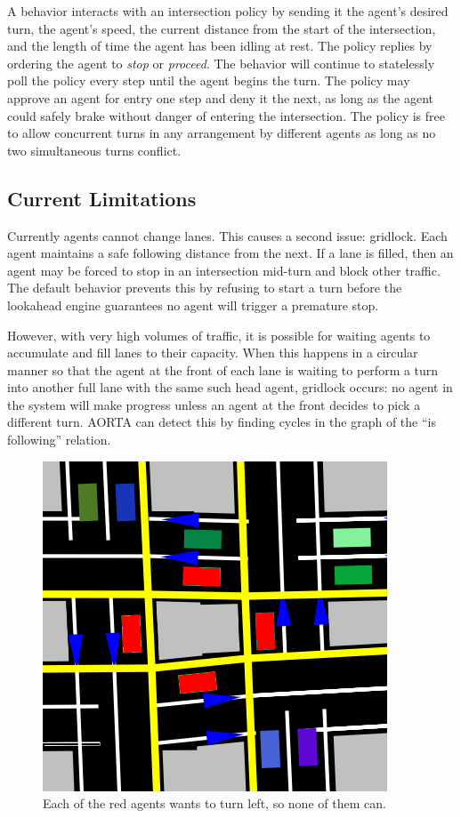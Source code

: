 \documentclass[letterpaper, 10 pt, conference]{ieeeconf}  %
\begin{document}
A behavior interacts with an intersection policy by sending it the agent's
desired turn, the agent's speed, the current distance from the start of the
intersection, and the length of time the agent has been idling at rest. The
policy replies by ordering the agent to \textit{stop} or \textit{proceed}. The behavior
will continue to statelessly poll the policy every step until the agent begins
the turn. The policy may approve an agent for entry one step and deny it the
next, as long as the agent could safely brake without danger of entering the
intersection. The policy is free to allow concurrent turns in any arrangement by
different agents as long as no two simultaneous turns conflict.

\subsection{Current Limitations}

Currently agents cannot change lanes. This causes a second issue: gridlock.
Each agent maintains a safe following distance from the next. If a lane is
filled, then an agent may be forced to stop in an intersection mid-turn and
block other traffic. The default behavior prevents this by refusing to start a
turn before the lookahead engine guarantees no agent will trigger a premature
stop.

However, with very high volumes of traffic, it is possible for waiting agents to
accumulate and fill lanes to their capacity. When this happens in a circular
manner so that the agent at the front of each lane is waiting to perform a turn
into another full lane with the same such head agent, gridlock \cite{AAAI11-au}
occurs: no agent in the system will make progress unless an agent at the front
decides to pick a different turn.  AORTA can detect this by finding cycles in
the graph of the ``is following'' relation.

\begin{figure}[h]
  \centering \includegraphics[scale=0.25]{gridlock.png}
  \caption{Each of the red agents wants to turn left, so none of them can.}
  \label{fig:gridlock}
  \vspace{-10pt}
\end{figure}
\end{document}
